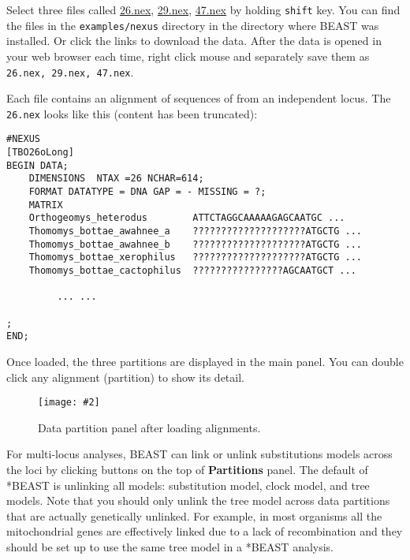 \documentclass{article}
\newcommand{\includeimage}[2][]{%
\texttt{[image: \#2]}
}
\begin{document}
Select three files called \href{https://github.com/CompEvol/beast2/blob/master/examples/nexus/26.nex?raw=true}{26.nex}, \href{https://github.com/CompEvol/beast2/blob/master/examples/nexus/29.nex?raw=true}{29.nex}, \href{https://github.com/CompEvol/beast2/blob/master/examples/nexus/47.nex?raw=true}{47.nex} by holding \texttt{shift} key. 
You can find the files in the {\tt examples/nexus} directory in the directory where BEAST was installed. 
Or click the links to download the data. After the data is opened in your web browser each time, right click mouse and separately save them as \texttt{26.nex, 29.nex, 47.nex}.

Each file contains an alignment of sequences of from an independent locus. The \texttt{26.nex} looks like this (content has been truncated):

\begin{verbatim}
#NEXUS
[TBO26oLong]
BEGIN DATA;
	DIMENSIONS  NTAX =26 NCHAR=614;
	FORMAT DATATYPE = DNA GAP = - MISSING = ?;
	MATRIX	
	Orthogeomys_heterodus        ATTCTAGGCAAAAAGAGCAATGC ...
	Thomomys_bottae_awahnee_a    ????????????????????ATGCTG ...
	Thomomys_bottae_awahnee_b    ????????????????????ATGCTG ...
	Thomomys_bottae_xerophilus   ????????????????????ATGCTG ...
	Thomomys_bottae_cactophilus  ????????????????AGCAATGCT ...

         ... ...

;
END;
\end{verbatim}

\medskip{}

Once loaded, the three partitions are displayed in the main panel.
You can double click any alignment (partition) to show its detail.

\begin{figure}
\centering
\includeimage[scale=0.32,clip=true,trim=0 300 0 0]{figures/BEAUti_DataPartitions}

\caption{\label{fig.datapartition} Data partition panel after loading alignments.}
\end{figure}


For multi-locus analyses, BEAST can link or unlink substitutions models across the loci by clicking buttons on the top of {\bf Partitions} panel. The default of *BEAST is unlinking all models: substitution model, clock model, and tree models. Note that you should only unlink the tree model across data partitions that are actually genetically unlinked. For example, in most organisms all the mitochondrial genes are effectively linked due to a lack of recombination and they should be set up to use the same tree model in a *BEAST analysis. 
\end{document}
